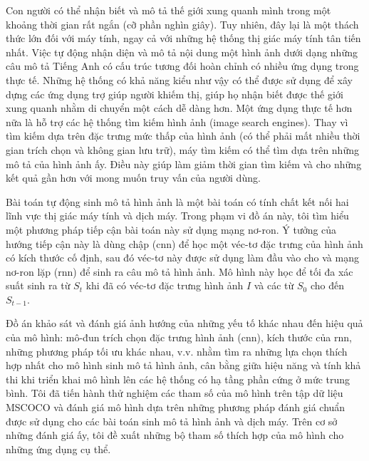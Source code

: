 \begin{vnabstract}
	\indent Con người có thể nhận biết và mô tả thế giới xung quanh mình trong một khoảng thời gian rất ngắn (cỡ phần nghìn giây). Tuy nhiên, đây lại là một thách thức lớn đối với máy tính, ngay cả với những hệ thống thị giác máy tính tân tiến nhất. Việc tự động nhận diện và mô tả nội dung một hình ảnh dưới dạng những câu mô tả Tiếng Anh có cấu trúc tương đối hoàn chỉnh có nhiều ứng dụng trong thực tế.  Những hệ thống có khả năng kiểu như vậy có thể được sử dụng để xây dựng các ứng dụng trợ giúp người khiếm thị, giúp họ nhận biết được thế giới xung quanh nhằm di chuyển một cách dễ dàng hơn. Một ứng dụng thực tế hơn nữa là hỗ trợ các hệ thống tìm kiếm hình ảnh (image search engines). Thay vì tìm kiếm dựa trên đặc trưng mức thấp của hình ảnh (có thể phải mất nhiều thời gian trích chọn và không gian lưu trữ), máy tìm kiếm có thể tìm dựa trên những mô tả của hình ảnh ấy. Điều này giúp làm giảm thời gian tìm kiếm và cho những kết quả gần hơn với mong muốn truy vấn của người dùng.

	Bài toán tự động sinh mô tả hình ảnh là một bài toán có tính chất kết nối hai lĩnh vực thị giác máy tính và dịch máy. Trong phạm vi đồ án này, tôi tìm hiểu một phương pháp tiếp cận bài toán này sử dụng mạng nơ-ron. Ý tưởng của hướng tiếp cận này là dùng chập (\gls{cnn}) để học một véc-tơ đặc trưng của hình ảnh có kích thước cố định, sau đó véc-tơ này được sử dụng làm đầu vào cho và mạng nơ-ron lặp (\gls{rnn}) để sinh ra câu mô tả hình ảnh. Mô hình này học để tối đa xác suất sinh ra từ $S_t$ khi đã có véc-tơ đặc trưng hình ảnh $I$ và các từ $S_0$ cho đến $S_{t-1}$.

	Đồ án khảo sát và đánh giá ảnh hướng của những yếu tố khác nhau đến hiệu quả của mô hình: mô-đun trích chọn đặc trưng hình ảnh (\gls{cnn}), kích thước của \gls{rnn}, những phương pháp tối ưu khác nhau, v.v. nhằm tìm ra những lựa chọn thích hợp nhất cho mô hình sinh mô tả hình ảnh, cân bằng giữa hiệu năng và tính khả thi khi triển khai mô hình lên các hệ thống có hạ tầng phần cứng ở mức trung bình. Tôi đã tiến hành thử nghiệm các tham số của mô hình trên tập dữ liệu MSCOCO và đánh giá mô hình dựa trên những phương pháp đánh giá chuẩn được sử dụng cho các bài toán sinh mô tả hình ảnh và dịch máy. Trên cơ sở những đánh giá ấy, tôi đề xuất những bộ tham số thích hợp của mô hình cho những ứng dụng cụ thể.

\end{vnabstract}